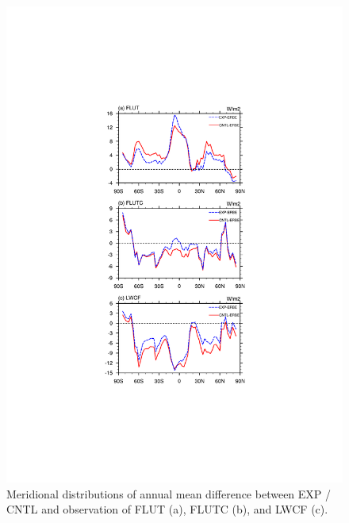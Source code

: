 \documentclass[gmd, manuscript]{copernicus}
\begin{document}
\begin{figure}[t]
\includegraphics[width=12cm]{radiation_curve}
\caption{Meridional distributions of annual mean difference between EXP / CNTL and observation of FLUT (a), FLUTC (b), and LWCF (c).}
\end{figure}

\clearpage





\end{document}
